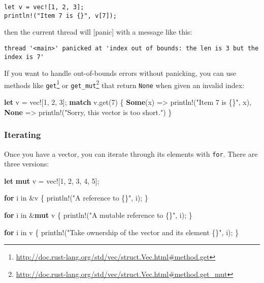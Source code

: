 \documentclass[a4paper,]{book}
\newenvironment{Shaded}{\begin{snugshade}}{\end{snugshade}}
\newcommand{\KeywordTok}[1]{\textcolor[rgb]{0.13,0.29,0.53}{\textbf{{#1}}}}
\newcommand{\DecValTok}[1]{\textcolor[rgb]{0.00,0.00,0.81}{{#1}}}
\newcommand{\StringTok}[1]{\textcolor[rgb]{0.31,0.60,0.02}{{#1}}}
\newcommand{\OtherTok}[1]{\textcolor[rgb]{0.56,0.35,0.01}{{#1}}}
\newcommand{\NormalTok}[1]{{#1}}
\renewcommand{\href}[2]{#2\footnote{\url{#1}}}
\begin{document}
\begin{verbatim}
let v = vec![1, 2, 3];
println!("Item 7 is {}", v[7]);
\end{verbatim}

then the current thread will {[}panic{]} with a message like this:

\begin{verbatim}
thread '<main>' panicked at 'index out of bounds: the len is 3 but the index is 7'
\end{verbatim}

If you want to handle out-of-bounds errors without panicking, you can
use methods like
\href{http://doc.rust-lang.org/std/vec/struct.Vec.html\#method.get}{\texttt{get}}
or
\href{http://doc.rust-lang.org/std/vec/struct.Vec.html\#method.get_mut}{\texttt{get\_mut}}
that return \texttt{None} when given an invalid index:

\begin{Shaded}
\begin{Highlighting}[]
\KeywordTok{let} \NormalTok{v = }\OtherTok{vec!}\NormalTok{[}\DecValTok{1}\NormalTok{, }\DecValTok{2}\NormalTok{, }\DecValTok{3}\NormalTok{];}
\KeywordTok{match} \NormalTok{v.get(}\DecValTok{7}\NormalTok{) \{}
    \KeywordTok{Some}\NormalTok{(x) => }\OtherTok{println!}\NormalTok{(}\StringTok{"Item 7 is \{\}"}\NormalTok{, x),}
    \KeywordTok{None} \NormalTok{=> }\OtherTok{println!}\NormalTok{(}\StringTok{"Sorry, this vector is too short."}\NormalTok{)}
\NormalTok{\}}
\end{Highlighting}
\end{Shaded}

\subsubsection{Iterating}\label{iterating}

Once you have a vector, you can iterate through its elements with
\texttt{for}. There are three versions:

\begin{Shaded}
\begin{Highlighting}[]
\KeywordTok{let} \KeywordTok{mut} \NormalTok{v = }\OtherTok{vec!}\NormalTok{[}\DecValTok{1}\NormalTok{, }\DecValTok{2}\NormalTok{, }\DecValTok{3}\NormalTok{, }\DecValTok{4}\NormalTok{, }\DecValTok{5}\NormalTok{];}

\KeywordTok{for} \NormalTok{i in &v \{}
    \OtherTok{println!}\NormalTok{(}\StringTok{"A reference to \{\}"}\NormalTok{, i);}
\NormalTok{\}}

\KeywordTok{for} \NormalTok{i in &}\KeywordTok{mut} \NormalTok{v \{}
    \OtherTok{println!}\NormalTok{(}\StringTok{"A mutable reference to \{\}"}\NormalTok{, i);}
\NormalTok{\}}

\KeywordTok{for} \NormalTok{i in v \{}
    \OtherTok{println!}\NormalTok{(}\StringTok{"Take ownership of the vector and its element \{\}"}\NormalTok{, i);}
\NormalTok{\}}
\end{Highlighting}
\end{Shaded}
\end{document}
